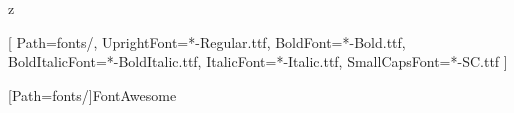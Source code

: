 z
\usepackage{etoolbox} %

\setlength\parindent{0pt} %

\usepackage{supertabular} %


\usepackage{geometry} %

\geometry{
  hmargin=1.3cm,
  vmargin=1.5cm,
  a4paper,
}

\usepackage{paracol} %


\setlength{} %


\usepackage{fontspec} %

\setmainfont{EBGaramond}[ %
Path=fonts/, %
UprightFont=*-Regular.ttf,
BoldFont=*-Bold.ttf,
BoldItalicFont=*-BoldItalic.ttf,
ItalicFont=*-Italic.ttf,
SmallCapsFont=*-SC.ttf
]

\newfontfamily{} %

\newfontfamily{\FA}[Path=fonts/]{FontAwesome} %

\usepackage[sf,scale=0.95]{libertine} %

